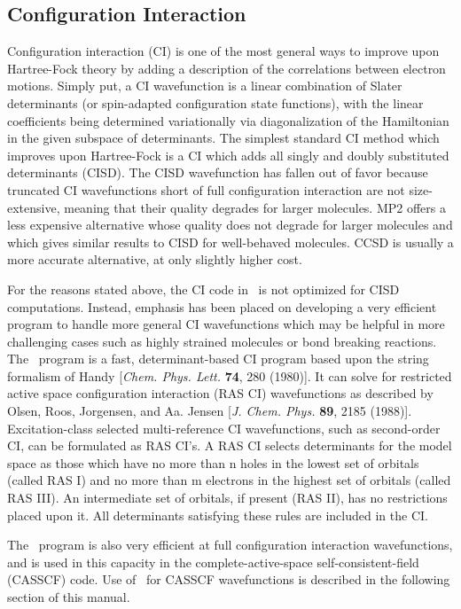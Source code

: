 \subsection{Configuration Interaction} \label{detci}
                                                                                
Configuration interaction (CI) is one of the most general ways to improve
upon Hartree-Fock theory by adding a description of the correlations
between electron motions.  Simply put, a CI wavefunction is a linear
combination of Slater determinants (or spin-adapted configuration
state functions), with the linear coefficients being determined 
variationally via diagonalization of the Hamiltonian in the given
subspace of determinants.  The simplest standard CI method which improves
upon Hartree-Fock is a CI which adds all singly and doubly substituted
determinants (CISD).  The CISD wavefunction
has fallen out of favor because truncated CI wavefunctions
short of full configuration interaction
are not size-extensive, meaning that their
quality degrades for larger molecules.  MP2 offers a less expensive
alternative whose quality does not degrade for larger molecules and which 
gives similar results to CISD for well-behaved molecules.  CCSD is 
usually a more accurate alternative, at only slightly higher
cost.

For the reasons stated above, the CI code in \PSIthree\ is not optimized
for CISD computations.  Instead, emphasis has been placed on developing
a very efficient program to handle more general CI wavefunctions
which may be helpful in more challenging cases such as highly strained
molecules or bond breaking reactions.  The \PSIdetci\ program is a fast,
determinant-based CI program based upon the string formalism of Handy
[{\em Chem. Phys.  Lett.} {\bf 74}, 280 (1980)].  It can solve for
restricted active space configuration interaction (RAS CI) wavefunctions
as described by Olsen, Roos, Jorgensen, and Aa. Jensen [{\em J. Chem.
Phys.} {\bf 89}, 2185 (1988)].  Excitation-class selected multi-reference
CI wavefunctions, such as second-order CI, can be formulated as RAS CI's.
A RAS CI selects determinants for the model space as those which have no
more than n holes in the lowest set of orbitals (called RAS I) and no
more than m electrons in the highest set of orbitals (called RAS III).
An intermediate set of orbitals, if present (RAS II), has no restrictions
placed upon it.  All determinants satisfying these rules are included
in the CI.  


The \PSIdetci\ program is also very efficient
at full configuration interaction wavefunctions, and is used in this
capacity in the complete-active-space self-consistent-field (CASSCF)
code.  Use of \PSIdetci\ for CASSCF wavefunctions is described
in the following section of this manual.

